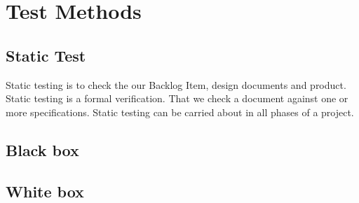 \section{Test Methods}
\subsection{Static Test}
Static testing is to check the our Backlog Item, design documents and product. Static testing is a formal verification. That we check a document against one or more specifications. Static testing can be carried about in all phases of a project.
\subsection{Black box}
\subsection{White box}

